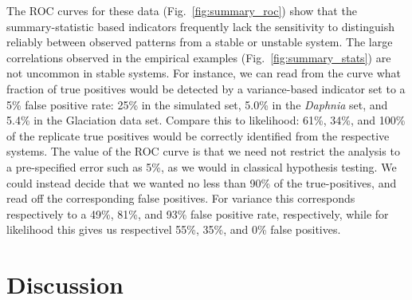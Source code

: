 \documentclass[authoryear,review,11pt]{elsarticle}
\newcommand{\cb}[1]{{\it (#1)}}
\begin{document}
 The ROC curves for these data (Fig.~\ref{fig:summary_roc}) show that the summary-statistic based indicators 
frequently lack the sensitivity to distinguish reliably between observed patterns from a stable or unstable system. 
The large correlations observed in the empirical examples (Fig.~\ref{fig:summary_stats}) are not uncommon in stable systems. 
For instance, we can read from the curve what fraction of true positives would be detected by a variance-based indicator
set to a 5\% false positive rate:
25\% in the simulated set,
5.0\% in the \emph{Daphnia} set,
and 5.4\% in the Glaciation data set.
Compare this to likelihood: 61\%, 34\%, and 100\% of the replicate true positives
would be correctly identified from the respective systems.
The value of the ROC curve is that we need not restrict the analysis to a pre-specified error such as 5\%,
as we would in classical hypothesis testing.  
We could instead decide that we wanted no less than 90\% of the true-positives,
and read off the corresponding false positives.  
For variance this corresponds respectively to a 49\%, 81\%, and 93\% false positive rate, respectively,
while for likelihood this gives us respectivel 55\%, 35\%, and 0\% false positives.



\section{Discussion}


\end{document}
